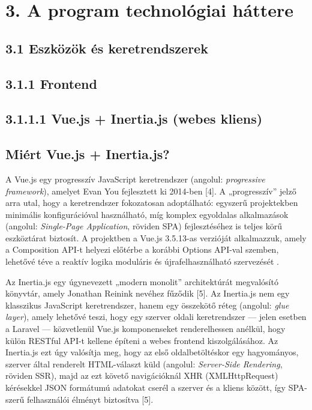 \chapter{3. A program technológiai háttere}\label{a-program-technoluxf3giai-huxe1ttere}

\section{3.1 Eszközök és keretrendszerek}\label{eszkuxf6zuxf6k-uxe9s-keretrendszerek}

\section{3.1.1 Frontend}\label{frontend}

\section{3.1.1.1 Vue.js + Inertia.js (webes kliens)}\label{vue.js-inertia.js-webes-kliens}

\section{Miért Vue.js + Inertia.js?}\label{miuxe9rt-vue.js-inertia.js}

A Vue.js egy progresszív JavaScript keretrendszer (angolul: \emph{progressive framework}), amelyet Evan You fejlesztett ki 2014-ben {[}4{]}. A „progresszív'' jelző arra utal, hogy a keretrendszer fokozatosan adoptálható: egyszerű projektekben minimális konfigurációval használható, míg komplex egyoldalas alkalmazások (angolul: \emph{Single-Page Application}, röviden SPA) fejlesztéséhez is teljes körű eszköztárat biztosít. A projektben a Vue.js 3.5.13-as verzióját alkalmazzuk, amely a Composition API-t helyezi előtérbe a korábbi Options API-val szemben, lehetővé téve a reaktív logika moduláris és újrafelhasználható szervezését .

Az Inertia.js egy úgynevezett „modern monolit'' architektúrát megvalósító könyvtár, amely Jonathan Reinink nevéhez fűződik {[}5{]}. Az Inertia.js nem egy klasszikus JavaScript keretrendszer, hanem egy összekötő réteg (angolul: \emph{glue layer}), amely lehetővé teszi, hogy egy szerver oldali keretrendszer --- jelen esetben a Laravel --- közvetlenül Vue.js komponenseket renderelhessen anélkül, hogy külön RESTful API-t kellene építeni a webes frontend kiszolgálásához. Az Inertia.js ezt úgy valósítja meg, hogy az első oldalbetöltéskor egy hagyományos, szerver által renderelt HTML-választ küld (angolul: \emph{Server-Side Rendering}, röviden SSR), majd az ezt követő navigációknál XHR (XMLHttpRequest) kérésekkel JSON formátumú adatokat cserél a szerver és a kliens között, így SPA-szerű felhasználói élményt biztosítva {[}5{]}.

